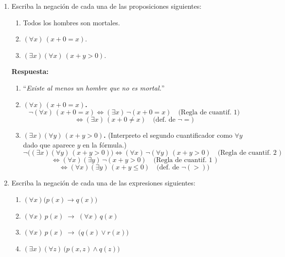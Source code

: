 \documentclass[12pt,letterpaper]{exam}
\begin{document}
\begin{enumerate}
\begin{enumerate}[label=\alph*)]
\end{enumerate}
    \item Escriba la negación de cada una de las proposiciones siguientes:
    \begin{enumerate}[label=\alph*)]
      \item Todos los hombres son mortales.
      \item $(\forall x)\,(x+0=x).$
      \item $(\exists x)(\forall x)\,(x+y>0).$
    \end{enumerate}

    \textbf{Respuesta:}

    \begin{enumerate}[label=\alph*)]
\item “\emph{Existe al menos un hombre que no es mortal.}”
\item \textbf{\((\forall x)\,(x+0=x)\).}
\[
\neg(\forall x)\,(x+0=x)
\iff (\exists x)\,\neg(x+0=x) 
\quad\text{(Regla de cuantif.\ 1)}
\]
\[
\iff (\exists x)\,(x+0\neq x)
\quad\text{(def.\ de \(\neg=\))}
\]
\item \textbf{\((\exists x)(\forall y)\,(x+y>0)\).}  
(Interpreto el segundo cuantificador como \(\forall y\) dado que aparece \(y\) en la fórmula.)
\[
\neg\big((\exists x)(\forall y)\,(x+y>0)\big)
\iff (\forall x)\,\neg(\forall y)\,(x+y>0)
\quad\text{(Regla de cuantif.\ 2 )}
\]
\[
\iff (\forall x)(\exists y)\,\neg(x+y>0)
\quad\text{(Regla de cuantif.\ 1 )}
\]
\[
\iff (\forall x)(\exists y)\,(x+y\le 0)
\quad\text{(def.\ de \(\neg(>)\))}
\]

\end{enumerate}
    \item Escriba la negación de cada una de las expresiones siguientes:
    \begin{enumerate}[label=\alph*)]
      \item $(\forall x)\big(p(x)\to q(x)\big)$
      \item $(\forall x)\,p(x)\;\to\;(\forall x)\,q(x)$
      \item $(\forall x)\,p(x)\;\to\;\big(q(x)\vee r(x)\big)$
      \item $(\exists x)(\forall z)\,\big(p(x,z)\wedge q(z)\big)$
    \end{enumerate}


\end{enumerate}
\end{document}
